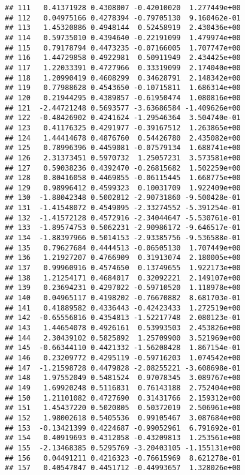 \documentclass[
]{article}
\begin{document}
\begin{verbatim}
## 111   0.41371928 0.4308007 -0.42010020  1.277449e+00
## 112   0.04975166 0.4278394 -0.79705130  9.160462e-01
## 113   1.45320886 0.4948144  0.52458919  2.430436e+00
## 114   0.59735010 0.4394640 -0.22191099  1.479974e+00
## 115   0.79178794 0.4473235 -0.07166005  1.707747e+00
## 116   1.44729858 0.4922981  0.50911949  2.434425e+00
## 117   1.22033391 0.4727966  0.33319099  2.174040e+00
## 118   1.20990419 0.4608299  0.34628791  2.148342e+00
## 119   0.77988628 0.4543650 -0.10715811  1.686314e+00
## 120   0.21944295 0.4389857 -0.61950474  1.080816e+00
## 121  -2.44721248 0.5693577 -3.63686584 -1.409626e+00
## 122  -0.48426902 0.4241624 -1.29546364  3.504740e-01
## 123   0.41176325 0.4291977 -0.39167512  1.263865e+00
## 124   1.44414678 0.4876760  0.54426780  2.435082e+00
## 125   0.78996396 0.4459081 -0.07579134  1.688741e+00
## 126   2.31373451 0.5970732  1.25057231  3.573581e+00
## 127   0.59038236 0.4392470 -0.26815682  1.502259e+00
## 128   0.80416058 0.4469855 -0.06115445  1.668775e+00
## 129   0.98996412 0.4599323  0.10031709  1.922409e+00
## 130  -1.88042348 0.5002812 -2.90731860 -9.500428e-01
## 131  -1.41548072 0.4549095 -2.33274552 -5.391254e-01
## 132  -1.41572128 0.4572916 -2.34044647 -5.530761e-01
## 133  -1.89574753 0.5062231 -2.90986172 -9.646517e-01
## 134  -1.88397966 0.5014153 -2.93385756 -9.536588e-01
## 135   0.79627684 0.4444513 -0.06505130  1.707449e+00
## 136   1.21927207 0.4766909  0.31913074  2.180005e+00
## 137   0.99960916 0.4574650  0.13749655  1.922173e+00
## 138   1.21254171 0.4684017  0.32092221  2.149107e+00
## 139   0.23694231 0.4297022 -0.59710520  1.118978e+00
## 140   0.04965117 0.4198202 -0.76670882  8.681703e-01
## 141   0.41889582 0.4336443 -0.42423433  1.272519e+00
## 142  -0.65556816 0.4354813 -1.52217748  2.080123e-01
## 143   1.44654078 0.4926161  0.53993503  2.453826e+00
## 144   2.30439102 0.5825892  1.25709900  3.521969e+00
## 145  -0.66344110 0.4421332 -1.56208428  1.867154e-01
## 146   0.23209772 0.4295119 -0.59716203  1.074542e+00
## 147  -1.21598728 0.4479828 -2.08255221 -3.608698e-01
## 148   1.97552049 0.5481524  0.97078345  3.089767e+00
## 149   1.69920248 0.5116831  0.76143188  2.752404e+00
## 150   1.21101082 0.4727690  0.31431766  2.159312e+00
## 151   1.45437220 0.5020805  0.50372019  2.506961e+00
## 152   1.98002618 0.5405536  0.99105467  3.087684e+00
## 153  -0.13421399 0.4224687 -0.99052961  6.791692e-01
## 154   0.40919693 0.4312058 -0.43209813  1.253561e+00
## 155  -2.13468385 0.5295769 -3.20403105 -1.155131e+00
## 156   0.04491211 0.4216323 -0.76615969  8.621278e-01
## 157   0.40547847 0.4451712 -0.44993657  1.328026e+00

\end{verbatim}
\end{document}
